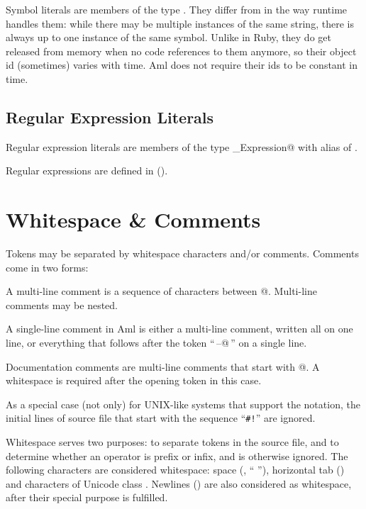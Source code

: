 Symbol literals are members of the type \lstinline@Symbol@. They differ from  in the way runtime handles them: while there may be multiple instances of the same string, there is always up to one instance of the same symbol. Unlike in Ruby, they do get released from memory when no code references to them anymore, so their object id (sometimes) varies with time. Aml does not require their ids to be constant in time. 









\subsection{Regular Expression Literals}
\label{sec:regexpliterals}

Regular expression literals are members of the type \lstinline@Regular_Expression@ with alias of \lstinline@Regexp@. 

Regular expressions are defined in (). 





\section{Whitespace \& Comments}
\label{sec:whitespacecomments}

Tokens may be separated by whitespace characters and/or comments. Comments come in two forms: 

A multi-line comment is a sequence of characters between @. Multi-line comments may be nested.

A single-line comment in Aml is either a multi-line comment, written all on one line, or everything that follows after the token ``\,\lstinline@--@\,'' on a single line.

Documentation comments are multi-line comments that start with @. A whitespace is required after the opening token in this case. 

As a special case (not only) for UNIX-like systems that support the notation, the initial lines of source file that start with the sequence ``\lstinline[language={[ExtraComments]Aml}]@#!@'' are ignored. 

Whitespace serves two purposes: to separate tokens in the source file, and to determine whether an operator is prefix or infix, and is otherwise ignored. The following characters are considered whitespace: space (, `` ''), horizontal tab () and characters of Unicode class . Newlines () are also considered as whitespace, after their special purpose is fulfilled. 

